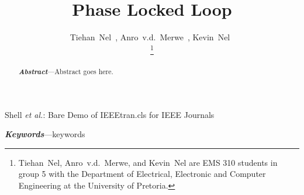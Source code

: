 \documentclass[journal,12pt,onecolumn,draftclsnofoot]{IEEEtran}
\begin{document}

	

	\footnotesize

	

	\normalsize

	\clearpage

	\thispagestyle{empty}
	\tableofcontents

	\clearpage

	\setcounter{page}{1} %


	\title{Phase Locked Loop}

	\author{Tiehan~Nel~,
			Anro~v.d.~Merwe~,
			Kevin~Nel~%


	\thanks{Tiehan~Nel, Anro~v.d.~Merwe, and Kevin~Nel are EMS 310 students in group 5 with the Department of Electrical, Electronic and Computer Engineering at the University of Pretoria.}}%


		{Shell \MakeLowercase{\textit{et al.}}: Bare Demo of IEEEtran.cls for IEEE Journals}

	\maketitle



	\begin{abstract}
		\begin{changemargin}{-8.55mm}{-8.55mm}
		\textbf{\textit{Abstract}}---Abstract goes here.
	\end{changemargin}
	\end{abstract}



	\begin{IEEEkeywords}
		\vspace{-2.25em}
		\begin{changemargin}{-8.55mm}{-8.55mm}
			\textbf{\textit{Keywords}}---keywords
		\end{changemargin}
	\end{IEEEkeywords}
\end{document}

